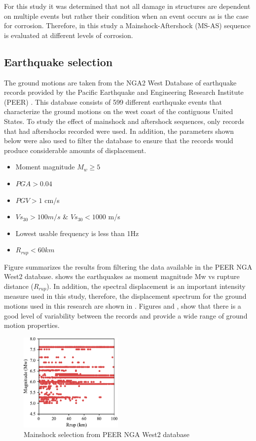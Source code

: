 For this study it was determined that not all damage in structures are dependent on multiple events but rather their condition when an event occurs as is the case for corrosion. Therefore, in this study a Mainshock-Aftershock (MS-AS) sequence is evaluated at different levels of corrosion.

\subsection{Earthquake selection}

The ground motions are taken from the NGA2 West Database of earthquake records provided by the Pacific Earthquake and Engineering Research Institute (PEER) \cite{Ancheta2014}. This database consists of 599 different earthquake events that characterize the ground motions on the west coast of the contiguous United States. To study the effect of mainshock and aftershock sequences, only records that had aftershocks recorded were used. In addition, the parameters shown below were also used to filter the database to ensure that the records would produce considerable amounts of displacement.

\begin{itemize}
	\item Moment magnitude $M_w \geqslant 5$
	\item $PGA>0.04$
	\item $PGV>1$ cm/s
	\item $Vs_{30}>100m/s$ \& $Vs_{30}<1000$ m/s
	\item Lowest usable frequency is less than 1Hz
	\item $R_{rup}<60km$
\end{itemize}

Figure  summarizes the results from filtering the data available in the PEER NGA West2 database.  shows the earthquakes as moment magnitude {Mw} vs rupture distance ($R_{rup}$). In addition, the spectral displacement is an important intensity measure used in this study, therefore, the displacement spectrum for the ground motions used in this research are shown in . Figures  and , show that there is a good level of variability between the records and provide a wide range of ground motion properties. 

\begin{figure}[htbp]
	\centering
	\includegraphics[width=0.45\textwidth]{Chapter-5/figs/GM_Selection.pdf}
	\caption{Mainshock selection from PEER NGA West2 database}
	\label{fig:GM_Selection}
\end{figure}

